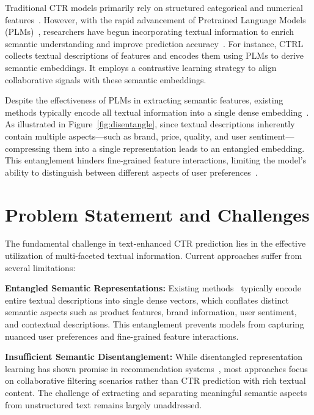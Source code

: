 Traditional CTR models primarily rely on structured categorical and numerical features~\cite{guo2021dual, liu2020autofis}. However, with the rapid advancement of Pretrained Language Models (PLMs)~\cite{devlin2019bert}, researchers have begun incorporating textual information to enrich semantic understanding and improve prediction accuracy~\cite{wang2023bert4ctr, chen2023tbin}. For instance, CTRL~\cite{li2023ctrl} collects textual descriptions of features and encodes them using PLMs to derive semantic embeddings. It employs a contrastive learning strategy to align collaborative signals with these semantic embeddings. 

Despite the effectiveness of PLMs in extracting semantic features, existing methods typically encode all textual information into a single dense embedding~\cite{liu2020category, yang2019learning}. As illustrated in Figure~\ref{fig:disentangle}, since textual descriptions inherently contain multiple aspects—such as brand, price, quality, and user sentiment—compressing them into a single representation leads to an entangled embedding. This entanglement hinders fine-grained feature interactions, limiting the model's ability to distinguish between different aspects of user preferences~\cite{ma2019learning, wang2020disentangled}.

\section{Problem Statement and Challenges}

The fundamental challenge in text-enhanced CTR prediction lies in the effective utilization of multi-faceted textual information. Current approaches suffer from several limitations:

\textbf{Entangled Semantic Representations:} Existing methods~\cite{li2023ctrl, wang2023bert4ctr} typically encode entire textual descriptions into single dense vectors, which conflates distinct semantic aspects such as product features, brand information, user sentiment, and contextual descriptions. This entanglement prevents models from capturing nuanced user preferences and fine-grained feature interactions.

\textbf{Insufficient Semantic Disentanglement:} While disentangled representation learning has shown promise in recommendation systems~\cite{ma2019learning, wang2021multimodal, cao2022disencdr}, most approaches focus on collaborative filtering scenarios rather than CTR prediction with rich textual content. The challenge of extracting and separating meaningful semantic aspects from unstructured text remains largely unaddressed.

